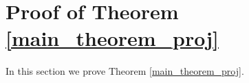 \documentclass{amsart}
\renewcommand{\leq}{\leqslant}
\numberwithin{claimcounter}{theorem}
\begin{document}

\section{Proof of Theorem \ref{main_theorem_proj}}

	In this section we prove Theorem \ref{main_theorem_proj}.
\end{document}
